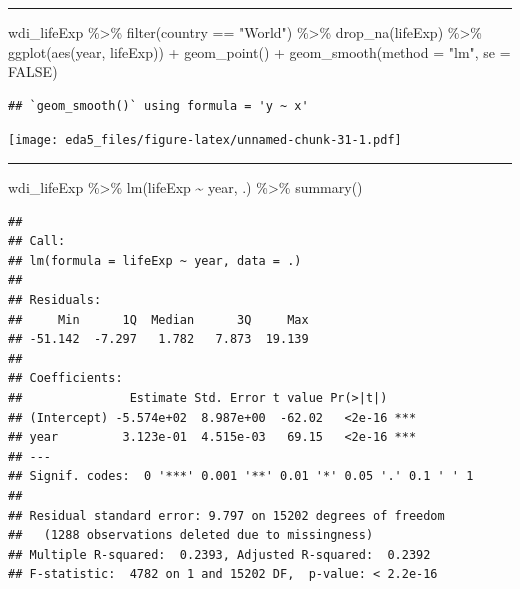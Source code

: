 \documentclass[
]{article}
\newenvironment{Shaded}{\begin{snugshade}}{\end{snugshade}}
\newcommand{\AttributeTok}[1]{\textcolor[rgb]{0.77,0.63,0.00}{#1}}
\newcommand{\ConstantTok}[1]{\textcolor[rgb]{0.00,0.00,0.00}{#1}}
\newcommand{\FunctionTok}[1]{\textcolor[rgb]{0.00,0.00,0.00}{#1}}
\newcommand{\NormalTok}[1]{#1}
\newcommand{\SpecialCharTok}[1]{\textcolor[rgb]{0.00,0.00,0.00}{#1}}
\newcommand{\StringTok}[1]{\textcolor[rgb]{0.31,0.60,0.02}{#1}}
\begin{document}
\begin{center}\rule{0.5\linewidth}{0.5pt}\end{center}

\begin{Shaded}
\begin{Highlighting}[]
\NormalTok{wdi\_lifeExp }\SpecialCharTok{\%\textgreater{}\%} \FunctionTok{filter}\NormalTok{(country }\SpecialCharTok{==} \StringTok{"World"}\NormalTok{) }\SpecialCharTok{\%\textgreater{}\%} \FunctionTok{drop\_na}\NormalTok{(lifeExp) }\SpecialCharTok{\%\textgreater{}\%}
  \FunctionTok{ggplot}\NormalTok{(}\FunctionTok{aes}\NormalTok{(year, lifeExp)) }\SpecialCharTok{+} \FunctionTok{geom\_point}\NormalTok{() }\SpecialCharTok{+} \FunctionTok{geom\_smooth}\NormalTok{(}\AttributeTok{method =} \StringTok{"lm"}\NormalTok{, }\AttributeTok{se =} \ConstantTok{FALSE}\NormalTok{)}
\end{Highlighting}
\end{Shaded}

\begin{verbatim}
## `geom_smooth()` using formula = 'y ~ x'
\end{verbatim}

\texttt{[image: eda5\_files/figure-latex/unnamed-chunk-31-1.pdf]}

\begin{center}\rule{0.5\linewidth}{0.5pt}\end{center}

\begin{Shaded}
\begin{Highlighting}[]
\NormalTok{wdi\_lifeExp }\SpecialCharTok{\%\textgreater{}\%} \FunctionTok{lm}\NormalTok{(lifeExp }\SpecialCharTok{\textasciitilde{}}\NormalTok{ year, .) }\SpecialCharTok{\%\textgreater{}\%} \FunctionTok{summary}\NormalTok{()}
\end{Highlighting}
\end{Shaded}

\begin{verbatim}
## 
## Call:
## lm(formula = lifeExp ~ year, data = .)
## 
## Residuals:
##     Min      1Q  Median      3Q     Max 
## -51.142  -7.297   1.782   7.873  19.139 
## 
## Coefficients:
##               Estimate Std. Error t value Pr(>|t|)    
## (Intercept) -5.574e+02  8.987e+00  -62.02   <2e-16 ***
## year         3.123e-01  4.515e-03   69.15   <2e-16 ***
## ---
## Signif. codes:  0 '***' 0.001 '**' 0.01 '*' 0.05 '.' 0.1 ' ' 1
## 
## Residual standard error: 9.797 on 15202 degrees of freedom
##   (1288 observations deleted due to missingness)
## Multiple R-squared:  0.2393, Adjusted R-squared:  0.2392 
## F-statistic:  4782 on 1 and 15202 DF,  p-value: < 2.2e-16
\end{verbatim}
\end{document}
